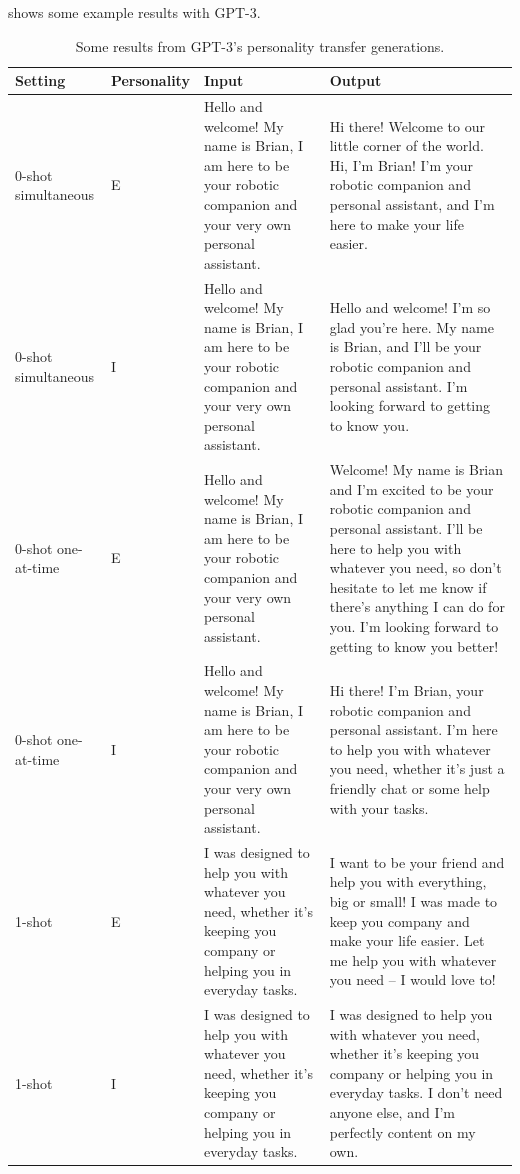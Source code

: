 \documentclass[nomenclature, english, biblatex]{kththesis}
\begin{document}
 shows some example results with GPT-3.
\begin{table}
    \centering
    \begin{adjustbox}{max width=\textwidth}
        \begin{tabular}{|p{}|p{}|p{}|p{}|}
        \hline
        Setting & Personality & Input & Output \\
        \hline
        \hline
        0-shot simultaneous & E & Hello and welcome! My name is Brian, I am here to be your robotic companion and your very own personal assistant. & Hi there! Welcome to our little corner of the world. Hi, I'm Brian! I'm your robotic companion and personal assistant, and I'm here to make your life easier. \\
        \hline
        0-shot simultaneous & I & Hello and welcome! My name is Brian, I am here to be your robotic companion and your very own personal assistant. & Hello and welcome! I'm so glad you're here. My name is Brian, and I'll be your robotic companion and personal assistant. I'm looking forward to getting to know you.\\
        \hline
        0-shot one-at-time & E & Hello and welcome! My name is Brian, I am here to be your robotic companion and your very own personal assistant. & Welcome! My name is Brian and I’m excited to be your robotic companion and personal assistant. I’ll be here to help you with whatever you need, so don’t hesitate to let me know if there’s anything I can do for you. I’m looking forward to getting to know you better!\\
        \hline
        0-shot one-at-time & I & Hello and welcome! My name is Brian, I am here to be your robotic companion and your very own personal assistant. & Hi there! I’m Brian, your robotic companion and personal assistant. I’m here to help you with whatever you need, whether it’s just a friendly chat or some help with your tasks.\\
        \hline
        1-shot & E & I was designed to help you with whatever you need, whether it’s keeping you company or helping you in everyday tasks. & I want to be your friend and help you with everything, big or small! I was made to keep you company and make your life easier. Let me help you with whatever you need – I would love to!\\
        \hline
        1-shot & I & I was designed to help you with whatever you need, whether it’s keeping you company or helping you in everyday tasks. & I was designed to help you with whatever you need, whether it’s keeping you company or helping you in everyday tasks. I don’t need anyone else, and I’m perfectly content on my own.\\
        \hline
        \end{tabular}
    \end{adjustbox}
    \caption{Some results from GPT-3's personality transfer generations.}
    \label{tab:gpt3_results}
\end{table}
 
\end{document}
